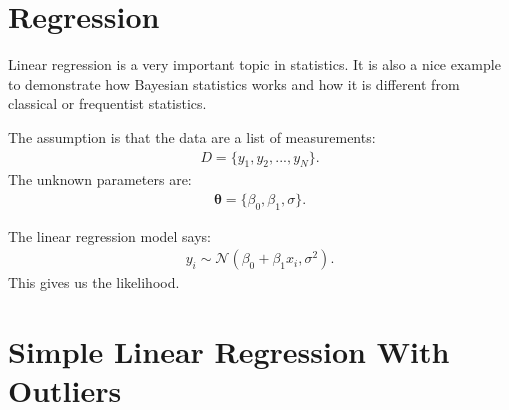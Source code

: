 \chapter{Regression}

Linear regression is a very important topic in statistics. It is also a nice
example to demonstrate how Bayesian statistics works and how it is different
from classical or frequentist statistics.

The assumption is that the data are a list of measurements:
\begin{eqnarray}
D = \{y_1, y_2, ..., y_N\}.
\end{eqnarray}
The unknown parameters are:
\begin{eqnarray}
\boldsymbol{\theta} = \{\beta_0, \beta_1, \sigma\}.
\end{eqnarray}

The linear regression model says:
\begin{eqnarray}
y_i \sim \mathcal{N}\left(\beta_0 + \beta_1 x_i, \sigma^2\right).
\end{eqnarray}
This gives us the likelihood.




\chapter{Simple Linear Regression With Outliers}

